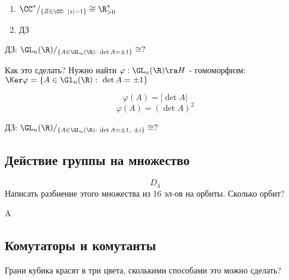 \documentclass[12pt, fleqn]{article}
\begin{document}
    \begin{sol}
      \begin{enumerate}
        \item $\CC^*/_{\{Z \in \CC:\ |z|=1\}} \cong \R^*_{>0}$
        \item ДЗ
      \end{enumerate}
    \end{sol}

    \begin{example}
      ДЗ: $\GL_n(\R)/_{\{A \in \GL_n(\R):\ \det A = \pm 1 \}} \cong ?$

      Как это сделать? Нужно найти $\varphi: \GL_n(\R) \ra H$ - гомоморфизм: $\Ker \varphi = \{ A \in \Gl_n(\R):\ \det A = \pm 1\}$
    \end{example}

    \begin{Sol}
      \[\varphi(A)=|\det A|\]
      \[\varphi(A)=(\det A)^2\]
    \end{Sol}

    ДЗ: $\GL_n(\R)/_{\{A \in \GL_n(\R):\ \det A = \pm 1,\ \pm i \}} \cong ?$

    \subsection{Действие группы на множество}

    \begin{Example}
      \[D_4\]
      Написать разбиение этого множества из 16 эл-ов на орбиты. Сколько орбит?
    \end{Example}

    \begin{Sol}
      A
    \end{Sol}

    \subsection{Комутаторы и комутанты}

    \begin{example}
      Грани кубика красят в три цвета, сколькими способами это можно сделать?
    \end{example}
\end{document}

